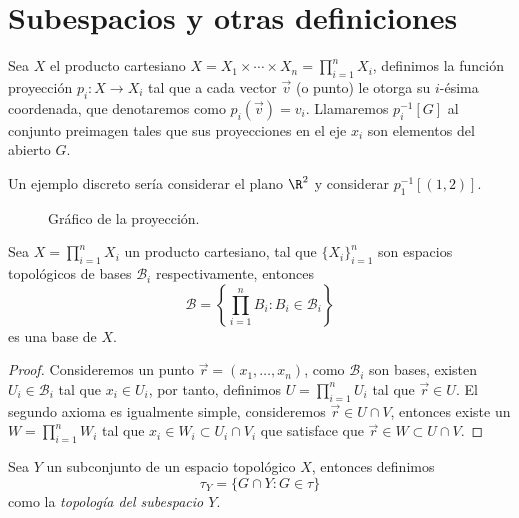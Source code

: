 \documentclass[11pt,oneside,a4paper]{book}
\begin{document}
\section{Subespacios y otras definiciones}
\begin{mydef}[Proyección]
Sea $X$ el producto cartesiano $X=X_1\times\cdots\times X_n=\prod_{i=1}^n X_i$, definimos la función proyección $p_i:X\rightarrow X_i$ tal que a cada vector $\vec{v}$ (o punto) le otorga su $i$-ésima coordenada, que denotaremos como $p_i(\vec{v})=v_i$. Llamaremos $p_i^{-1}[G]$ al conjunto preimagen tales que sus proyecciones en el eje $x_i$ son elementos del abierto $G$.
\end{mydef}
Un ejemplo discreto sería considerar el plano $\R^2$ y considerar $p_1^{-1}[(1,2)]$.
\begin{figure}
\centering
{}
\caption{Gráfico de la proyección.}
\end{figure}
\begin{thm}
Sea $X=\prod_{i=1}^n X_i$ un producto cartesiano, tal que $\{X_i\}_{i=1}^n$ son espacios topológicos de bases $\mathcal{B}_i$ respectivamente, entonces
$$\mathcal{B}=\left\{\prod_{i=1}^n B_i:B_i\in\mathcal{B}_i\right\}$$
es una base de $X$.
\end{thm}
\begin{proof}
Consideremos un punto $\vec{r}=(x_1,\dots,x_n)$, como $\mathcal{B}_i$ son bases, existen $U_i\in\mathcal{B}_i$ tal que $x_i\in U_i$, por tanto, definimos $U=\prod_{i=1}^n U_i$ tal que $\vec{r}\in U$. El segundo axioma es igualmente simple, consideremos $\vec{r}\in U\cap V$, entonces existe un $W=\prod_{i=1}^n W_i$ tal que $x_i\in W_i\subset U_i\cap V_i$ que satisface que $\vec{r}\in W\subset U\cap V$.
\end{proof}
\begin{thm}
Sea $Y$ un subconjunto de un espacio topológico $X$, entonces definimos
$$\tau_Y=\{G\cap Y:G\in\tau\}$$
como la \textit{topología del subespacio $Y$}.
\end{thm}
\end{document}
